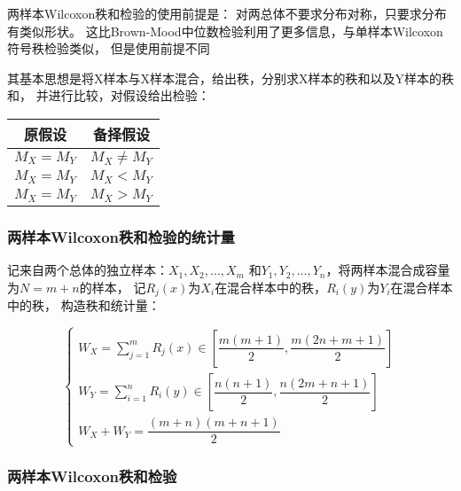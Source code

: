 \documentclass[UTF8]{ctexart}
\numberwithin{equation}{section}
\begin{document}
两样本Wilcoxon秩和检验的使用前提是：
对两总体不要求分布对称，只要求分布有类似形状。
这比Brown-Mood中位数检验利用了更多信息，与单样本Wilcoxon符号秩检验类似，
但是使用前提不同

其基本思想是将X样本与X样本混合，给出秩，分别求X样本的秩和以及Y样本的秩和，
并进行比较，对假设给出检验：

\begin{center}
    \begin{tabular}{cc}
        \toprule
        原假设 & 备择假设 \\
        \midrule
        $M_X = M_Y$ & $M_X \neq M_Y$ \\
        $M_X = M_Y$ & $M_X < M_Y$ \\
        $M_X = M_Y$ & $M_X > M_Y$ \\
        \bottomrule
    \end{tabular}
\end{center}

\subsubsection{两样本Wilcoxon秩和检验的统计量}

记来自两个总体的独立样本：$X_1,X_2,\dots,X_m$
和$Y_1, Y_2, \dots, Y_n$，将两样本混合成容量为$N=m+n$的样本，
记$R_j(x)$为$X_i$在混合样本中的秩，$R_i(y)$为$Y_i$在混合样本中的秩，
构造秩和统计量：

\begin{equation}
    \begin{cases}
        W_X = \sum_{j=1}^m R_j(x) \in [\dfrac{m(m+1)}{2}, \dfrac{m(2n+m+1)}{2}] \\
        W_Y = \sum_{i=1}^n R_i(y) \in [\dfrac{n(n+1)}{2}, \dfrac{n(2m+n+1)}{2}] \\
        W_X + W_Y = \dfrac{(m+n)(m+n+1)}{2}
    \end{cases}
    \nonumber
\end{equation}

\subsubsection{两样本Wilcoxon秩和检验}
\end{document}
